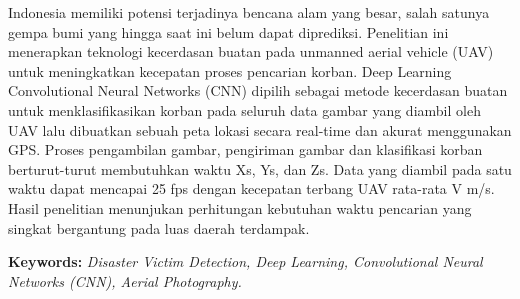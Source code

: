 \begin{abstract_en}


Indonesia memiliki potensi terjadinya bencana alam yang besar, salah satunya gempa bumi yang hingga saat ini belum dapat diprediksi. Penelitian ini menerapkan teknologi kecerdasan buatan pada unmanned aerial vehicle (UAV) untuk meningkatkan kecepatan proses pencarian korban. Deep Learning Convolutional Neural Networks (CNN) dipilih sebagai metode kecerdasan buatan untuk menklasifikasikan korban pada seluruh data gambar yang diambil oleh UAV lalu dibuatkan sebuah peta lokasi secara real-time dan akurat menggunakan GPS. Proses pengambilan gambar, pengiriman gambar dan klasifikasi korban berturut-turut membutuhkan waktu Xs, Ys, dan Zs. Data yang diambil pada satu waktu dapat mencapai 25 fps dengan kecepatan terbang UAV rata-rata V m/s. Hasil penelitian menunjukan perhitungan kebutuhan waktu pencarian yang singkat bergantung pada luas daerah terdampak.


{\noindent \textbf{Keywords:} \textit{Disaster Victim Detection, Deep Learning, Convolutional Neural Networks (CNN), Aerial Photography.}}
\end{abstract_en}

